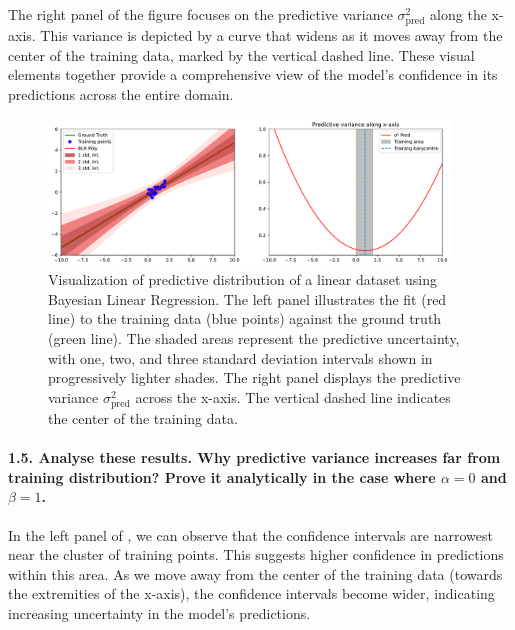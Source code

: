 The right panel of the figure focuses on the predictive variance $ \sigma^2_{\text{pred}}  $ along the x-axis. This variance is depicted by a curve that widens as it moves away from the center of the training data, marked by the vertical dashed line. These visual elements together provide a comprehensive view of the model's confidence in its predictions across the entire domain.
\begin{figure}[H]
    \centering
    \includegraphics[width=0.95\textwidth]{phi_linear.pdf}
    \caption{Visualization of predictive distribution of a linear dataset using Bayesian Linear Regression. The left panel illustrates the fit (red line) to the training data (blue points) against the ground truth (green line). The shaded areas represent the predictive uncertainty, with one, two, and three standard deviation intervals shown in progressively lighter shades. The right panel displays the predictive variance $\sigma^2_{\text{pred}} $ across the x-axis. The vertical dashed line indicates the center of the training data.}
    \label{fig:phi_linear}
\end{figure}

\paragraph*{1.5. Analyse these results. Why predictive variance increases far from training distribution? Prove it analytically in the case where $\alpha=0$ and $\beta=1$.}

In the left panel of , we can observe that the confidence intervals are narrowest near the cluster of training points. This suggests higher confidence in predictions within this area. As we move away from the center of the training data (towards the extremities of the x-axis), the confidence intervals become wider, indicating increasing uncertainty in the model's predictions.

